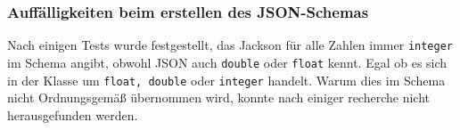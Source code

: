 \subsubsection{Auff\"alligkeiten beim erstellen des JSON-Schemas}
Nach einigen Tests wurde festgestellt, das Jackson f\"ur alle Zahlen immer \texttt{integer} im Schema angibt, obwohl JSON auch \texttt{double} oder \texttt{float} kennt. Egal ob es sich in der Klasse um \texttt{float, double} oder  \texttt{integer} handelt. Warum dies im Schema nicht Ordnungsgem\"a\ss{} \"ubernommen wird, konnte nach einiger recherche nicht herausgefunden werden.